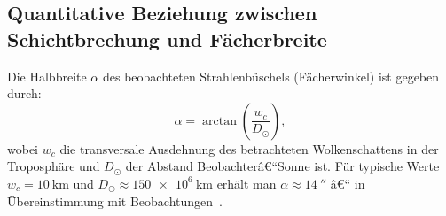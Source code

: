﻿\documentclass[12pt,a4paper]{article}
\begin{document}
\subsection{Quantitative Beziehung zwischen Schichtbrechung und Fächerbreite}

Die Halbbreite $\alpha$ des beobachteten Strahlenbüschels
(Fächerwinkel) ist gegeben durch:
\begin{equation}
  \alpha = \arctan\!\left(
    \frac{w_c}{D_\odot}
  \right),
  \label{eq:facher_winkel}
\end{equation}
wobei $w_c$ die transversale Ausdehnung des betrachteten
Wolkenschattens in der Troposphäre und $D_\odot$ der
Abstand Beobachterâ€“Sonne ist.
Für typische Werte $w_c = \SI{10}{\kilo\metre}$ und
$D_\odot \approx \SI{150e6}{\kilo\metre}$ erhält man
$\alpha \approx \SI{14}{\arcsecond}$ â€“ in Übereinstimmung mit
Beobachtungen~\citep{Greenler1980}.
\end{document}

